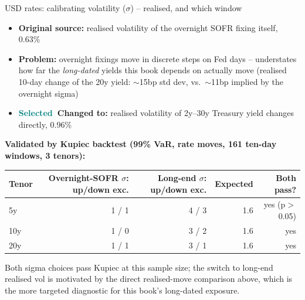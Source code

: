 \documentclass[8pt,aspectratio=169]{beamer}
\newcommand{\good}{\textcolor{teal}{\textbf{Selected}}}
\begin{document}
\begin{frame}{USD rates: calibrating volatility ($\sigma$) -- realised, and which window}
  \small
  \begin{itemize}
    \item \textbf{Original source:} realised volatility of the overnight SOFR fixing itself, 0.63\%
    \item \textbf{Problem:} overnight fixings move in discrete steps on Fed days -- understates how far the \emph{long-dated} yields this book depends on actually move (realised 10-day change of the 20y yield: $\sim$15bp std dev, vs.\ $\sim$11bp implied by the overnight sigma)
    \item \textbf{\good\ Changed to:} realised volatility of 2y--30y Treasury yield changes directly, 0.96\%
  \end{itemize}
  \vspace{8pt}
  \textbf{Validated by Kupiec backtest (99\% VaR, rate moves, 161 ten-day windows, 3 tenors):}
  \small
  \begin{tabular}{lrrrr}
    \toprule
    \textbf{Tenor} & \textbf{Overnight-SOFR $\sigma$: up/down exc.} & \textbf{Long-end $\sigma$: up/down exc.} & \textbf{Expected} & \textbf{Both pass?} \\
    \midrule
    5y & 1 / 1 & 4 / 3 & 1.6 & yes (p$>$0.05) \\
    10y & 1 / 0 & 3 / 2 & 1.6 & yes \\
    20y & 1 / 1 & 3 / 1 & 1.6 & yes \\
    \bottomrule
  \end{tabular}
  \vspace{4pt}

  Both sigma choices pass Kupiec at this sample size; the switch to long-end realised vol is motivated by the direct realised-move comparison above, which is the more targeted diagnostic for this book's long-dated exposure.
\end{frame}
\end{document}
